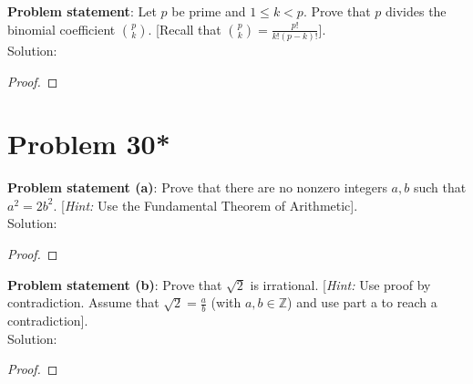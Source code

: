 \documentclass{article} %
\begin{document}
\textbf{Problem statement}: Let $p$ be prime and $1 \leq k < p$.  Prove that $p$ divides the binomial coefficient $\binom{p}{k}$.  [Recall that $\binom{p}{k} = \frac{p!}{k!(p-k)!}$].
\\

Solution: 
\begin{addmargin}[1em]{0em}
\begin{proof}

\end{proof}
\end{addmargin}

\newpage

\section*{Problem 30*}


\textbf{Problem statement (a)}:  Prove that there are no nonzero integers $a,b$ such that $a^2 = 2b^2$.  [\textit{Hint:} Use the Fundamental Theorem of Arithmetic].
\\

Solution: 
\begin{addmargin}[1em]{0em}
\begin{proof}

\end{proof}
\end{addmargin}

\hfill \break 

\textbf{Problem statement (b)}:  Prove that $\sqrt{2}$ is irrational.  [\textit{Hint:} Use proof by contradiction.  Assume that $\sqrt{2} = \frac{a}{b}$ (with $a,b \in \mathbb{Z}$) and use part {a} to reach a contradiction].
\\

Solution: 
\begin{addmargin}[1em]{0em}
\begin{proof}

\end{proof}
\end{addmargin}

\newpage
\end{document}
